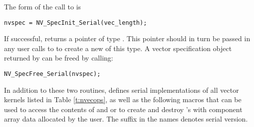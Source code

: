 \noindent The form of the call to  is
\begin{verbatim}
nvspec = NV_SpecInit_Serial(vec_length);
\end{verbatim}
If successful,  returns a pointer of type
. This pointer should in turn be passed in any user
calls to  to create a new  of this type.
A vector specification object  returned by 
can be freed by calling:
\begin{verbatim}
NV_SpecFree_Serial(nvspec);
\end{verbatim}
In addition to these two routines, {\nvecs} defines serial implementations of all 
vector kernels listed in Table \ref{t:nvecops}, as well as the following macros
that can be used to access the contents of  and 
or to create and destroy 's with component array data allocated
by the user. The suffix  in the names denotes serial version.
